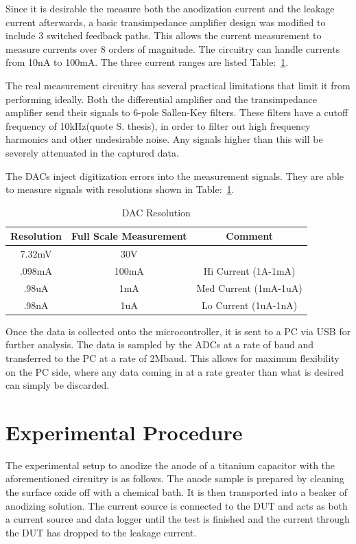 \documentclass[journal]{IEEEtran}
\begin{document}
Since it is desirable the measure both the anodization current and the leakage current afterwards, a basic transimpedance amplifier design was modified to include 3 switched feedback paths. This allows the current measurement to measure currents over 8 orders of magnitude. The circuitry can handle currents from 10nA to 100mA. The three current ranges are listed Table:~\ref{tab:dacRes}.

The real measurement circuitry has several practical limitations that limit it from performing ideally. Both the differential amplifier and the transimpedance amplifier send their signals to 6-pole Sallen-Key filters. These filters have a cutoff frequency of 10kHz(quote S. thesis), in order to filter out high frequency harmonics and other undesirable noise. Any signals higher than this will be severely attenuated in the captured data.

The DACs inject digitization errors into the measurement signals. They are able to measure signals with resolutions shown in Table:~\ref{tab:dacRes}.


\begin{table}[here]
\renewcommand{\arraystretch}{1.3}
\caption{DAC Resolution}
\label{tab:dacRes}
\centering
\begin{tabular}{c||c||c}
\hline
\bfseries Resolution & \bfseries Full Scale Measurement & \bfseries Comment\\
\hline\hline
7.32mV & 30V & \\
\hline\hline
.098mA & 100mA & Hi Current (1A-1mA)\\
\hline\hline
.98uA & 1mA & Med Current (1mA-1uA) \\
\hline\hline
.98nA & 1uA & Lo Current (1uA-1nA)\\
\hline
\end{tabular}
\end{table}

Once the data is collected onto the microcontroller, it is sent to a PC via USB for further analysis. The data is sampled by the ADCs at a rate of baud and transferred to the PC at a rate of 2Mbaud. This allows for maximum flexibility on the PC side, where any data coming in at a rate greater than what is desired can simply be discarded.

\section{Experimental Procedure}
The experimental setup to anodize the anode of a titanium capacitor with the aforementioned circuitry is as follows. The anode sample is prepared by cleaning the surface oxide off with a chemical bath. It is then transported into a beaker of anodizing solution. The current source is connected to the DUT and acts as both a current source and data logger until the test is finished and the current through the DUT has dropped to the leakage current.
\end{document}
